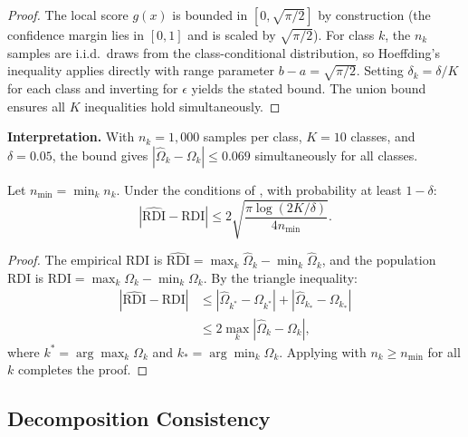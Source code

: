 \begin{proof}
The local score $g(x)$ is bounded in $[0, \sqrt{\pi/2}]$ by construction (the confidence margin lies in $[0, 1]$ and is scaled by $\sqrt{\pi/2}$). For class $k$, the $n_k$ samples are i.i.d.\ draws from the class-conditional distribution, so Hoeffding's inequality applies directly with range parameter $b - a = \sqrt{\pi/2}$. Setting $\delta_k = \delta/K$ for each class and inverting for $\epsilon$ yields the stated bound. The union bound ensures all $K$ inequalities hold simultaneously.
\end{proof}

\textbf{Interpretation.} With $n_k = 1{,}000$ samples per class, $K = 10$ classes, and $\delta = 0.05$, the bound gives $|\hat{\Omega}_k - \Omega_k| \leq 0.069$ simultaneously for all classes.

\begin{proposition}
\label{prop:rdi_concentration}
Let $n_{\min} = \min_k n_k$. Under the conditions of , with probability at least $1 - \delta$:
\begin{equation}
    |\widehat{\mathrm{RDI}} - \mathrm{RDI}| \leq 2\sqrt{\frac{\pi \log(2K/\delta)}{4 n_{\min}}}.
    \label{eq:rdi_concentration}
\end{equation}
\end{proposition}

\begin{proof}
The empirical RDI is $\widehat{\mathrm{RDI}} = \max_k \hat{\Omega}_k - \min_k \hat{\Omega}_k$, and the population RDI is $\mathrm{RDI} = \max_k \Omega_k - \min_k \Omega_k$. By the triangle inequality:
\begin{align}
    |\widehat{\mathrm{RDI}} - \mathrm{RDI}| &\leq |\hat{\Omega}_{k^*} - \Omega_{k^*}| + |\hat{\Omega}_{k_*} - \Omega_{k_*}| \nonumber \\
    &\leq 2 \max_k |\hat{\Omega}_k - \Omega_k|,
    \label{eq:rdi_triangle}
\end{align}
where $k^* = \arg\max_k \Omega_k$ and $k_* = \arg\min_k \Omega_k$. Applying  with $n_k \geq n_{\min}$ for all $k$ completes the proof.
\end{proof}

\subsection{Decomposition Consistency}
\label{sec:exp_decomposition}

